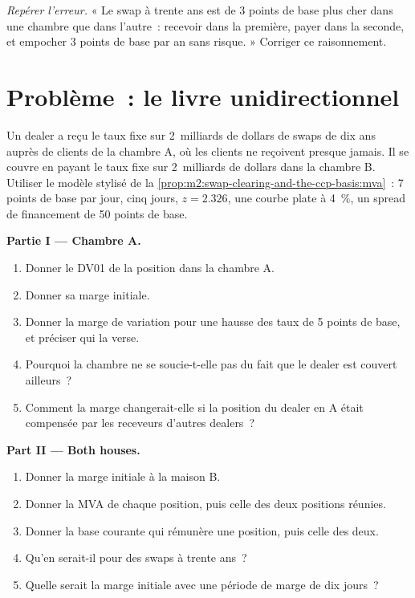 \begin{exercise}[$\star\star\star$]\label{exo:m2:swap-clearing-and-the-ccp-basis:8}
\emph{Repérer l'erreur.} « Le swap à trente ans est de 3 points de base plus cher dans une chambre
que dans l'autre~: recevoir dans la première, payer dans la seconde, et empocher 3 points de base
par an sans risque. » Corriger ce raisonnement.
\end{exercise}

\section{Problème~: le livre unidirectionnel}

\begin{problem}\label{pb:m2:swap-clearing-and-the-ccp-basis:1}
Un dealer a reçu le taux fixe sur 2~milliards de dollars de swaps de dix ans auprès de clients de la
chambre A, où les clients ne reçoivent presque jamais. Il se couvre en payant le taux fixe sur
2~milliards de dollars dans la chambre B. Utiliser le modèle stylisé de
la \cref{prop:m2:swap-clearing-and-the-ccp-basis:mva}~: 7 points de base par jour, cinq
jours, $z = 2.326$, une courbe plate à 4~\%, un spread de financement de 50 points de base.

\medskip\noindent\textbf{Partie I --- Chambre A.}
\begin{enumerate}
\item Donner le DV01 de la position dans la chambre A.
\item Donner sa marge initiale.
\item Donner la marge de variation pour une hausse des taux de 5 points de base, et préciser qui la verse.
\item Pourquoi la chambre ne se soucie-t-elle pas du fait que le dealer est couvert ailleurs~?
\item Comment la marge changerait-elle si la position du dealer en A était compensée par
les receveurs d'autres dealers~?
\end{enumerate}

\medskip\noindent\textbf{Part II --- Both houses.}
\begin{enumerate}[resume]
\item Donner la marge initiale à la maison B.
\item Donner la MVA de chaque position, puis celle des deux positions réunies.
\item Donner la base courante qui rémunère une position, puis celle des deux.
\item Qu'en serait-il pour des swaps à trente ans~?
\item Quelle serait la marge initiale avec une période de marge de dix jours~?
\end{enumerate}


\end{problem}
